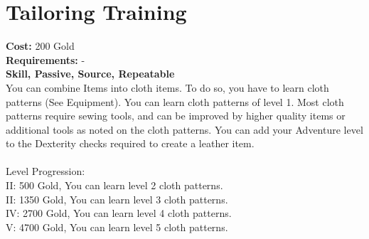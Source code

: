 \section{Tailoring Training}
\textbf{Cost:} 200 Gold\\
\textbf{Requirements:} -\\
\textbf{Skill, Passive, Source, Repeatable}\\
You can combine Items into cloth items. To do so, you have to learn cloth patterns (See Equipment). You can learn cloth patterns of level 1. Most cloth patterns require sewing tools, and can be improved by higher quality items or additional tools as noted on the cloth patterns. You can add your Adventure level to the Dexterity checks required to create a leather item.\\
\\
Level Progression:\\
II: 500 Gold, You can learn level 2 cloth patterns.\\
II: 1350 Gold, You can learn level 3 cloth patterns.\\
IV: 2700 Gold, You can learn level 4 cloth patterns.\\
V: 4700 Gold, You can learn level 5 cloth patterns.\\